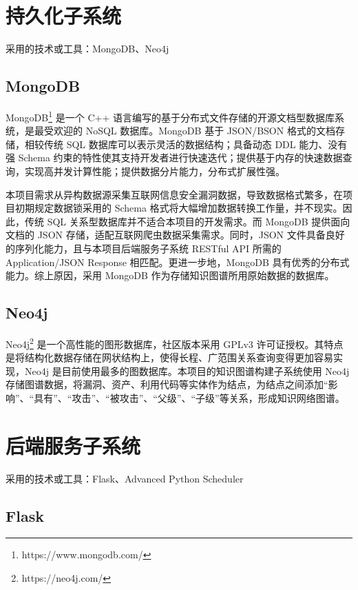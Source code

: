 \documentclass[a4paper,AutoFakeBold,oneside,12pt]{book}
\begin{document}
\section{持久化子系统}

采用的技术或工具：MongoDB、Neo4j

\subsection{MongoDB}

MongoDB\footnote{https://www.mongodb.com/} 是一个 C++ 语言编写的基于分布式文件存储的开源文档型数据库系统，是最受欢迎的 NoSQL 数据库。MongoDB 基于 JSON/BSON 格式的文档存储，相较传统 SQL 数据库可以表示灵活的数据结构；具备动态 DDL 能力、没有强 Schema 约束的特性使其支持开发者进行快速迭代；提供基于内存的快速数据查询，实现高并发计算性能；提供数据分片能力，分布式扩展性强。

本项目需求从异构数据源采集互联网信息安全漏洞数据，导致数据格式繁多，在项目初期规定数据锁采用的 Schema 格式将大幅增加数据转换工作量，并不现实。因此，传统 SQL 关系型数据库并不适合本项目的开发需求。而 MongoDB 提供面向文档的 JSON 存储，适配互联网爬虫数据采集需求。同时，JSON 文件具备良好的序列化能力，且与本项目后端服务子系统 RESTful API 所需的 Application/JSON Response 相匹配。更进一步地，MongoDB 具有优秀的分布式能力。综上原因，采用 MongoDB 作为存储知识图谱所用原始数据的数据库。

\subsection{Neo4j}

Neo4j\footnote{https://neo4j.com/} 是一个高性能的图形数据库，社区版本采用 GPLv3 许可证授权。其特点是将结构化数据存储在网状结构上，使得长程、广范围关系查询变得更加容易实现，Neo4j 是目前使用最多的图数据库。本项目的知识图谱构建子系统使用 Neo4j 存储图谱数据，将漏洞、资产、利用代码等实体作为结点，为结点之间添加“影响”、“具有”、“攻击”、“被攻击”、“父级”、“子级”等关系，形成知识网络图谱。

\section{后端服务子系统}

采用的技术或工具：Flask、Advanced Python Scheduler

\subsection{Flask}
\end{document}
